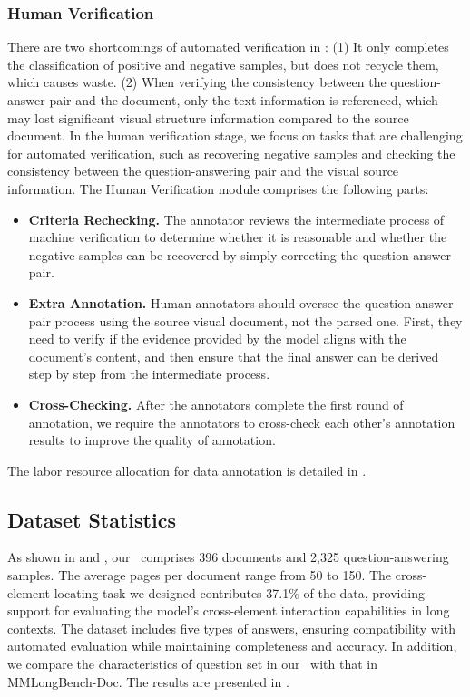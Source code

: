 \subsubsection{Human Verification}
\label{subsubsec:human_verify}
There are two shortcomings of automated verification in : (1) It only completes the classification of positive and negative samples, but does not recycle them, which causes waste. (2) When verifying the consistency between the question-answer pair and the document, only the text information is referenced, which may lost significant visual structure information compared to the source document. In the human verification stage, we focus on tasks that are challenging for automated verification, such as recovering negative samples and checking the consistency between the question-answering pair and the visual source information. The Human Verification module comprises the following parts: 

\begin{itemize}[leftmargin=*]
    \item \textbf{Criteria Rechecking.} The annotator reviews the intermediate process of machine verification to determine whether it is reasonable and whether the negative samples can be recovered by simply correcting the question-answer pair.
    \item \textbf{Extra Annotation.} Human annotators should oversee the question-answer pair process using the source visual document, not the parsed one. First, they need to verify if the evidence provided by the model aligns with the document's content, and then ensure that the final answer can be derived step by step from the intermediate process.
    \item \textbf{Cross-Checking.} After the annotators complete the first round of annotation, we require the annotators to cross-check each other's annotation results to improve the quality of annotation.
\end{itemize}

The labor resource allocation for data annotation is detailed in .


\subsection{Dataset Statistics}
\label{Dataset Statistics}

As shown in  and , our \benchName~comprises 396 documents and 2,325 question-answering samples. The average pages per document range from 50 to 150. The cross-element locating task we designed contributes 37.1\% of the data, providing support for evaluating the model's cross-element interaction capabilities in long contexts. The dataset includes five types of answers, ensuring compatibility with automated evaluation while maintaining completeness and accuracy. In addition, we compare the characteristics of question set in our \benchName~with that in MMLongBench-Doc. The results are presented in .


